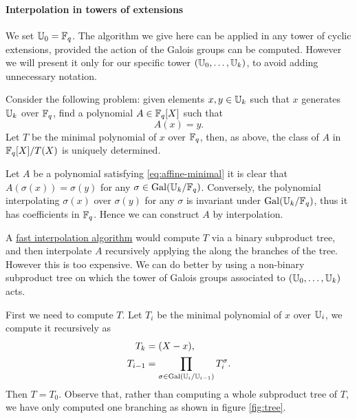 \paragraph{Interpolation in towers of extensions}
We set $\mathbb{U}_0=\mathbb{F}_q$. The algorithm we give here can be applied in any
tower of cyclic extensions, provided the action of the Galois groups
can be computed. However we will present it only for our specific
tower $(\mathbb{U}_0,\dots,\mathbb{U}_k)$, to avoid adding unnecessary notation.

Consider the following problem: given elements $x,y\in\mathbb{U}_k$ such that
$x$ generates $\mathbb{U}_k$ over $\mathbb{F}_q$, find a polynomial $A\in\mathbb{F}_q[X]$ such
that
\begin{equation}
  \label{eq:affine-minimal}
  A(x) = y
  \text{.}
\end{equation}
Let $T$ be the minimal polynomial of $x$ over $\mathbb{F}_q$, then, as above,
the class of $A$ in $\mathbb{F}_q[X]/T(X)$ is uniquely determined.

Let $A$ be a polynomial satisfying \eqref{eq:affine-minimal} it is
clear that $A(\sigma(x)) = \sigma(y)$ for any
$\sigma\in\operatorname{Gal}(\mathbb{U}_k/\mathbb{F}_q)$. Conversely, the polynomial interpolating
$\sigma(x)$ over $\sigma(y)$ for any $\sigma$ is invariant under
$\operatorname{Gal}(\mathbb{U}_k/\mathbb{F}_q)$, thus it has coefficients in $\mathbb{F}_q$. Hence we can
construct $A$ by interpolation.

A \hyperref[sec:chin-rema-algor]{fast interpolation algorithm} would
compute $T$ via a binary subproduct tree, and then interpolate $A$
recursively applying the  along the
branches of the tree. However this is too expensive. We can do better
by using a non-binary subproduct tree on which the tower of Galois
groups associated to $(\mathbb{U}_0,\ldots,\mathbb{U}_k)$ acts.

First we need to compute $T$. Let $T_i$ be the minimal polynomial of
$x$ over $\mathbb{U}_i$, we compute it recursively as
\begin{align}
  T_k &= (X - x)\text{,}\\
  \label{eq:minprod}
  T_{i-1} &= \prod_{\sigma\in\operatorname{Gal}(\mathbb{U}_{i}/\mathbb{U}_{i-1})}T_{i}^\sigma\text{.}
\end{align}
Then $T=T_0$. Observe that, rather than computing a whole subproduct
tree of $T$, we have only computed one branching as shown in figure
\ref{fig:tree}.

